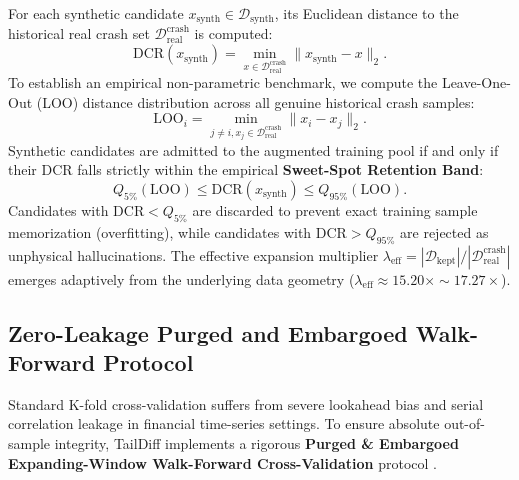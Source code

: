 \documentclass[preprint,12pt,authoryear]{elsarticle}
\begin{document}
For each synthetic candidate $x_{\text{synth}} \in \mathcal{D}_{\text{synth}}$, its Euclidean distance to the historical real crash set $\mathcal{D}_{\text{real}}^{\text{crash}}$ is computed:
\begin{equation}
    \text{DCR}(x_{\text{synth}}) = \min_{x \in \mathcal{D}_{\text{real}}^{\text{crash}}} \| x_{\text{synth}} - x \|_2.
\end{equation}
To establish an empirical non-parametric benchmark, we compute the Leave-One-Out (LOO) distance distribution across all genuine historical crash samples:
\begin{equation}
    \text{LOO}_i = \min_{j \neq i, x_j \in \mathcal{D}_{\text{real}}^{\text{crash}}} \| x_i - x_j \|_2.
\end{equation}
Synthetic candidates are admitted to the augmented training pool if and only if their DCR falls strictly within the empirical \textbf{Sweet-Spot Retention Band}:
\begin{equation}
    Q_{5\%}(\text{LOO}) \le \text{DCR}(x_{\text{synth}}) \le Q_{95\%}(\text{LOO}).
\end{equation}
Candidates with $\text{DCR} < Q_{5\%}$ are discarded to prevent exact training sample memorization (overfitting), while candidates with $\text{DCR} > Q_{95\%}$ are rejected as unphysical hallucinations. The effective expansion multiplier $\lambda_{\text{eff}} = |\mathcal{D}_{\text{kept}}| / |\mathcal{D}_{\text{real}}^{\text{crash}}|$ emerges adaptively from the underlying data geometry ($\lambda_{\text{eff}} \approx 15.20\times \sim 17.27\times$).

\subsection{Zero-Leakage Purged and Embargoed Walk-Forward Protocol}
Standard K-fold cross-validation suffers from severe lookahead bias and serial correlation leakage in financial time-series settings. To ensure absolute out-of-sample integrity, TailDiff implements a rigorous \textbf{Purged \& Embargoed Expanding-Window Walk-Forward Cross-Validation} protocol \citep{lopez2018advances}.
\end{document}
